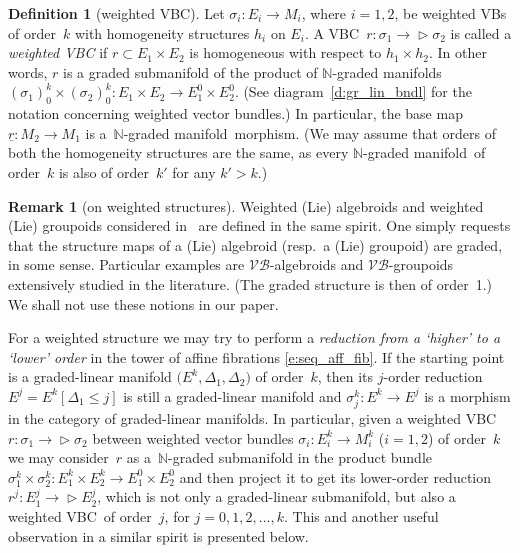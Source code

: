 \documentclass[10pt,a4paper]{amsart}
\newcommand{\grB}{{$\N$-graded manifold}}
\newcommand{\grBs}{{$\N$-graded manifolds}}
\newcommand{\ZM}{{VBC}} %
\newcommand{\degree}{{order}}
\newcommand{\N}{\mathbb{N}}
\newcommand{\und}{\underline}
\newcommand{\ra}{\rightarrow}
\newcommand{\VB}{\mathcal{VB}} %
\def\relto{\rightarrow\!\!\vartriangleright} %
\numberwithin{equation}{section}
\theoremstyle{definition}
\newtheorem{df}[thm]{Definition}
\newtheorem{rem}[thm]{Remark}
\begin{document}
\begin{df}[weighted \ZM ]\label{def:wZM} Let $\sigma_i\colon E_i\ra M_i$, where $i=1,2$, be weighted VBs of order~$k$ with homogeneity structures $h_i$ on $E_i$. A \ZM\ $r\colon \sigma_1\relto \sigma_2$ is called a \emph{weighted \ZM} if $r\subset E_1\times E_2$ is homogeneous with respect to $h_1\times h_2$. In other words, $r$ is a graded submanifold of the product of \grBs\ $(\sigma_1)^k_0 \times (\sigma_2)^k_0\colon E_1\times E_2 \ra E_1^0\times E_2^0$. (See diagram~\eqref{d:gr_lin_bndl} for the notation concerning weighted vector bundles.) In particular, the base map $\und{r}\colon M_2\ra M_1$ is a~\grB\ morphism. (We may assume that \degree s of both the homogeneity structures are the same, as every \grB\ of \degree\ $k$ is also of \degree\ ${k'}$ for any $k'>k$.)
\end{df}
\begin{rem}[on weighted structures] Weighted (Lie) algebroids and weighted (Lie) groupoids considered in~\cite{BGG} are defined in the same spirit. One simply requests that the structure maps of a (Lie) algebroid (resp.\ a (Lie) groupoid) are graded, in some sense. Particular examples are $\VB$-algebroids and $\VB$-groupoids extensively studied in the literature. (The graded structure is then of \degree\ 1.) We shall not use these notions in our paper.
\end{rem}

For a weighted structure we may try to perform a \emph{reduction from a `higher' to a `lower' order} in the tower of affine fibrations \eqref{e:seq_aff_fib}. If the starting point is a graded-linear manifold $\big(E^k, \Delta_1, \Delta_2\big)$ of \degree\ $k$, then its $j$-order reduction $E^j = E^k[\Delta_1\leq j]$ is still a graded-linear manifold and $\sigma^k_j\colon E^k\ra E^j$ is a morphism in the category of graded-linear manifolds.
In particular, given a weighted \ZM\ $r\colon \sigma_1 \relto \sigma_2$ between weighted vector bundles $\sigma_i\colon E^k_i\ra M_i^k$ ($i=1,2$) of \degree\ $k$ we may consider~$r$ as a~$\N$-graded submanifold in the product bundle $\sigma_1^k\times \sigma_2^k\colon E^k_1 \times E^k_2 \ra E^0_1 \times E^0_2$ and then project it to get its lower-order reduction \mbox{$r^j\colon E^j_1 \relto E^j_2$}, which is not only a graded-linear submanifold, but also a weighted \ZM\ of \degree\ $j$, for $j=0, 1, 2, \ldots, k$. This and another useful observation in a similar spirit is presented below.
\end{document}
